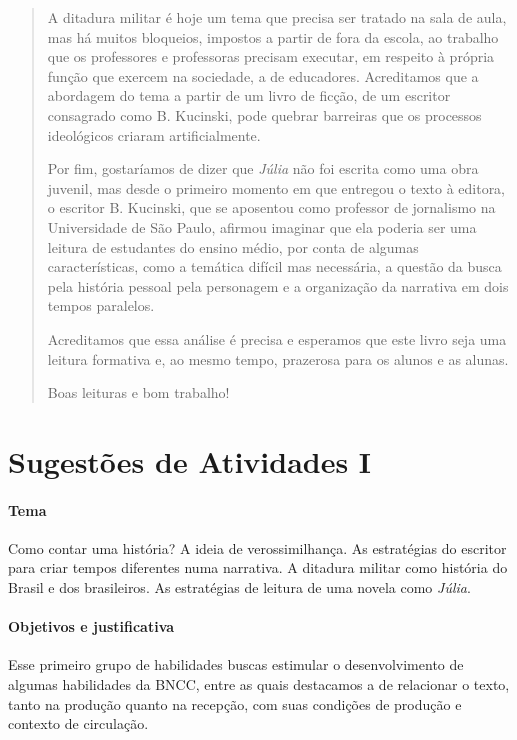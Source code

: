 \documentclass[12pt]{extarticle}
\begin{document}
\begin{abstract}
A ditadura militar é hoje um tema que precisa ser tratado na sala de
aula, mas há muitos bloqueios, impostos a partir de fora da escola, ao
trabalho que os professores e professoras precisam executar, em respeito
à própria função que exercem na sociedade, a de educadores. Acreditamos
que a abordagem do tema a partir de um livro de ficção, de um escritor
consagrado como B. Kucinski, pode quebrar barreiras que os processos
ideológicos criaram artificialmente.

Por fim, gostaríamos de dizer que \emph{Júlia} não foi escrita como uma
obra juvenil, mas desde o primeiro momento em que entregou o texto à
editora, o escritor B. Kucinski, que se aposentou como professor de
jornalismo na Universidade de São Paulo, afirmou imaginar que ela
poderia ser uma leitura de estudantes do ensino médio, por conta de
algumas características, como a temática difícil mas necessária, a
questão da busca pela história pessoal pela personagem e a organização
da narrativa em dois tempos paralelos.



Acreditamos que essa análise é precisa e esperamos que este livro seja
uma leitura formativa e, ao mesmo tempo, prazerosa para os alunos e as
alunas.

Boas leituras e bom trabalho!

\end{abstract}


\tableofcontents


\section{Sugestões de Atividades I}

\paragraph{Tema} Como contar uma história? A ideia de verossimilhança. As
estratégias do escritor para criar tempos diferentes numa narrativa. A
ditadura militar como história do Brasil e dos brasileiros. As
estratégias de leitura de uma novela como \emph{Júlia}.

\paragraph{Objetivos e justificativa}

Esse primeiro grupo de habilidades buscas estimular o desenvolvimento de algumas habilidades da BNCC, entre as quais destacamos a de relacionar o texto, tanto na produção quanto na recepção, com suas condições de produção e contexto de circulação. 
\end{document}

